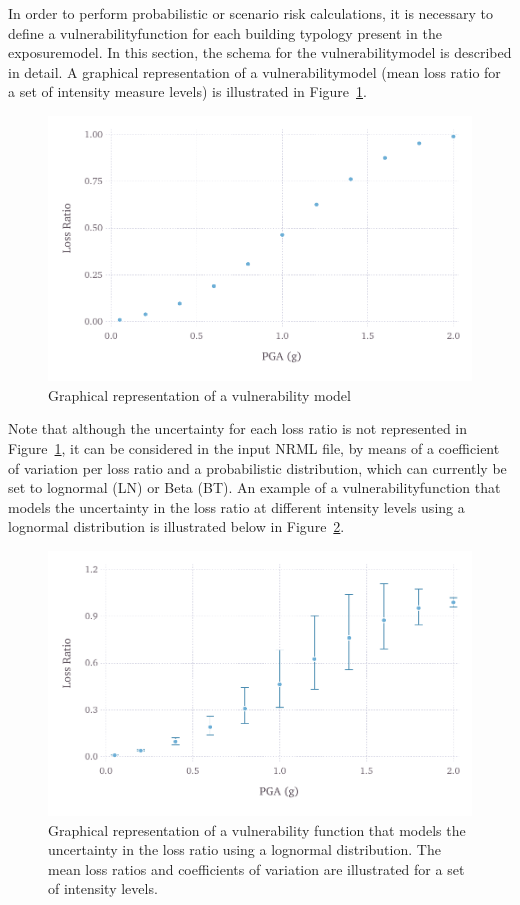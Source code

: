 In order to perform probabilistic or scenario risk calculations, it is
necessary to define a \gls{vulnerabilityfunction} for each building typology
present in the \gls{exposuremodel}. In this section, the schema for the
\gls{vulnerabilitymodel} is described in detail. A graphical representation of
a \gls{vulnerabilitymodel} (mean loss ratio for a set of intensity measure
levels) is illustrated in Figure~\ref{fig:vulnerability-zero-cov}.

\begin{figure}[ht]
\centering
\includegraphics[width=12cm]{figures/risk/vulnerability-zero-cov.pdf}
\caption{Graphical representation of a vulnerability model}
\label{fig:vulnerability-zero-cov}
\end{figure}


Note that although the uncertainty for each loss ratio is not represented in
Figure~\ref{fig:vulnerability-zero-cov}, it can be considered in the input
NRML file, by means of a coefficient of variation per loss ratio and a
probabilistic distribution, which can currently be set to lognormal (LN) or
Beta (BT). An example of a \gls{vulnerabilityfunction} that models the 
uncertainty in the loss ratio at different intensity levels using a lognormal
distribution is illustrated below in Figure~\ref{fig:vulnerability-nonzero-cov}.

\begin{figure}[ht]
\centering
\includegraphics[width=12cm]{figures/risk/vulnerability-nonzero-cov.pdf}
\caption{Graphical representation of a vulnerability function that models the uncertainty in the loss ratio using a lognormal distribution. The mean loss ratios and coefficients of variation are illustrated for a set of intensity levels.}
\label{fig:vulnerability-nonzero-cov}
\end{figure}

